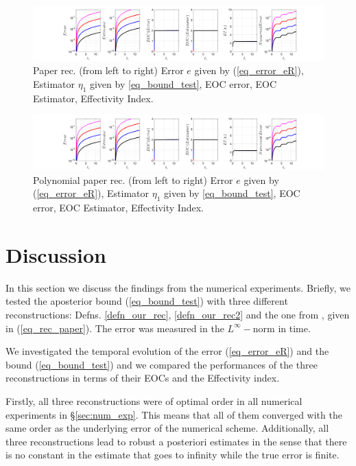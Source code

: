 \documentclass[12pt,a4paper]{article}
\numberwithin{equation}{section}
\theoremstyle{definition}
\begin{document}
\begin{figure}[H]
	\hspace{-3cm}
	\includegraphics[scale=0.55]{fig_LeapFrogplots_1x5_sin_IC_harmonic_u10_v0_paperrec}	
	\caption{Paper rec. (from left to right) Error $e$ given by (\ref{eq_error_eR}), Estimator $\eta_1$ given by \ref{eq_bound_test}, EOC error, EOC Estimator, Effectivity Index.}
	\label{fig_all_in_one_paperrec_u10_v1}
\end{figure}
\begin{figure}[H]
	\hspace{-3cm}
	\includegraphics[scale=0.55]{fig_LeapFrogplots_1x5_sin_IC_harmonic_u10_v0_paperrec_poly}	
	\caption{Polynomial paper rec. (from left to right) Error $e$ given by (\ref{eq_error_eR}), Estimator $\eta_1$ given by \ref{eq_bound_test}, EOC error, EOC Estimator, Effectivity Index.}
	\label{fig_all_in_one_paperrec_poly_u10_v1}
\end{figure}





\section{Discussion}\label{sec:discussion}
In this section we discuss the findings from the numerical experiments.  Briefly, we tested the aposterior bound (\ref{eq_bound_test}) with three different reconstructions: Defns. \ref{defn_our_rec}, \ref{defn_our_rec2} and the one from \cite{georgoulis2016posteriori}, given in (\ref{eq_rec_paper}).  The error was measured in the $L^{\infty}-$norm in time. 

 We investigated the temporal evolution of the error (\ref{eq_error_eR})  and the bound (\ref{eq_bound_test}) and we compared the performances of the three reconstructions in terms of their EOCs and the Effectivity index.

Firstly,  all three reconstructions were of optimal order in all numerical experiments in \S \ref{sec:num_exp}. This means that all of them converged with the same order as the underlying error of the numerical scheme.  
Additionally, all three reconstructions lead to robust a posteriori estimates in the sense that there is no constant in the estimate that goes to infinity  while the true error is finite.
\end{document}
